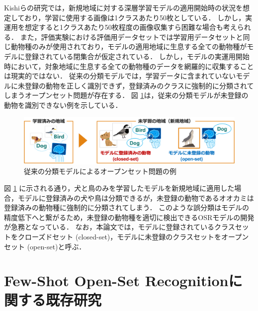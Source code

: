Kishiらの研究では，新規地域に対する深層学習モデルの適用開始時の状況を想定しており，学習に使用する画像は1クラスあたり50枚としている．
しかし，実運用を想定すると1クラスあたり50枚程度の画像収集すら困難な場合も考えられる．
また，評価実験における評価用データセットでは学習用データセットと同じ動物種のみが使用されており，モデルの適用地域に生息する全ての動物種がモデルに登録されている閉集合が仮定されている．
しかし，モデルの実運用開始時において，対象地域に生息する全ての動物種のデータを網羅的に収集することは現実的ではない．
従来の分類モデルでは，学習データに含まれていないモデルに未登録の動物を正しく識別できず，登録済みのクラスに強制的に分類されてしまうオープンセット問題が存在する．
図 \ref{fig:non_osr}は，従来の分類モデルが未登録の動物を識別できない例を示している．
% 
\begin{figure}[tbp]
  \centering
  \includegraphics[width=\linewidth, keepaspectratio]{image/non_osr.png}
  \caption{従来の分類モデルによるオープンセット問題の例}
  \label{fig:non_osr}
\end{figure}
% 
図 \ref{fig:non_osr} に示される通り，犬と鳥のみを学習したモデルを新規地域に適用した場合，モデルに登録済みの犬や鳥は分類できるが，未登録の動物であるオオカミは登録済みの動物種に強制的に分類されてしまう．
このような誤分類はモデルの精度低下へと繋がるため，未登録の動物種を適切に検出できるOSRモデルの開発が急務となっている．
なお，本論文では，モデルに登録されているクラスセットをクローズドセット (closed-set)，モデルに未登録のクラスセットをオープンセット (open-set)と呼ぶ．


\section{Few-Shot Open-Set Recognitionに関する既存研究}

